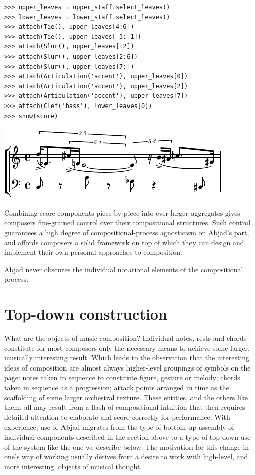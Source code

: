 \documentclass{article}
\begin{document}
\begin{lstlisting}
>>> upper_leaves = upper_staff.select_leaves()
>>> lower_leaves = lower_staff.select_leaves()
>>> attach(Tie(), upper_leaves[4:6])
>>> attach(Tie(), upper_leaves[-3:-1])
>>> attach(Slur(), upper_leaves[:2])
>>> attach(Slur(), upper_leaves[2:6])
>>> attach(Slur(), upper_leaves[7:])
>>> attach(Articulation('accent'), upper_leaves[0])
>>> attach(Articulation('accent'), upper_leaves[2])
>>> attach(Articulation('accent'), upper_leaves[7])
>>> attach(Clef('bass'), lower_leaves[0])
>>> show(score)
\end{lstlisting}
\includegraphics{assets/lilypond-e8875dc7bab70898d816689c758fd7be.pdf}

\noindent Combining score components piece by piece into ever-larger aggregates
gives composers fine-grained control over their compositional structures. Such
control guarantees a high degree of compositional-process agnosticism on
Abjad's part, and affords composers a solid framework on top of which they can
design and implement their own personal approaches to composition.

Abjad never obscures the individual notational elements of the compositional
process.

\section{Top-down construction} \label{sec:top-down}

What are the objects of music composition? Individual notes, rests and chords constitute for most composers only the necessary means to achieve some larger, musically interesting result. Which leads to the observation that the interesting ideas of composition are almost always higher-level groupings of symbols on the page: notes taken in sequence to constitute figure, gesture or melody; chords taken in sequence as a progression; attack points arranged in time as the scaffolding of some larger orchestral texture. These entities, and the others like them, all may result from a flash of compositional intuition that then requires detailed attention to elaborate and score correctly for performance. With experience, use of Abjad migrates from the type of bottom-up assembly of individual components described in the section above to a type of top-down use of the system like the one we describe below. The motivation for this change in one's way of working usually derives from a desire to work with high-level, and more interesting, objects of musical thought.  
\end{document}

